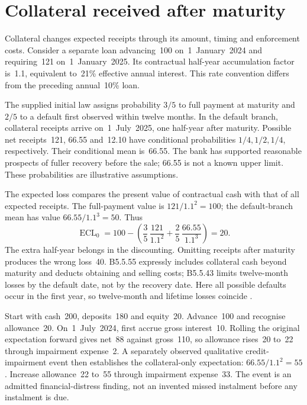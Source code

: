 \section{Collateral received after maturity}\label{sec:bank-late-collateral}

Collateral changes expected receipts through its amount, timing and
enforcement costs. Consider a separate loan advancing~100 on~1~January~2024
and requiring~121 on~1~January~2025. Its contractual half-year accumulation
factor is~1.1, equivalent to~21\% effective annual interest. This rate
convention differs from the preceding annual~10\% loan.

The supplied initial law assigns probability $3/5$ to full payment at maturity
and $2/5$ to a default first observed within twelve months. In the default
branch, collateral receipts arrive on~1~July~2025, one half-year after maturity.
Possible net receipts~121, 66.55 and~12.10 have conditional probabilities
$1/4,1/2,1/4$, respectively. Their conditional mean is~66.55. The bank has
supported reasonable prospects of fuller recovery before the sale; 66.55 is
not a known upper limit. These probabilities are illustrative assumptions.

The expected loss compares the present value of contractual cash with that
of all expected receipts. The full-payment value is $121/1.1^2=100$; the
default-branch mean has value $66.55/1.1^3=50$. Thus
\[
 \operatorname{ECL}_0
 =100-\left(\frac{3}{5}\,\frac{121}{1.1^2}
              +\frac{2}{5}\,\frac{66.55}{1.1^3}\right)=20.
\]
The extra half-year belongs in the discounting. Omitting receipts after
maturity produces the wrong loss~40. B5.5.55 expressly includes collateral
cash beyond maturity and deducts obtaining and selling costs; B5.5.43
limits twelve-month losses by the default date, not by the recovery date.
Here all possible defaults occur in the first year, so twelve-month and
lifetime losses coincide \citep[B5.5.43--44 and B5.5.55]{aasb9dated}.

Start with cash~200, deposits~180 and equity~20. Advance~100 and recognise
allowance~20. On~1~July~2024, first accrue gross interest~10. Rolling the
original expectation forward gives net~88 against gross~110, so allowance
rises~20 to~22 through impairment expense~2. A separately observed qualitative
credit-impairment event then establishes the collateral-only expectation:
$66.55/1.1^2=55$. Increase allowance~22 to~55 through impairment expense~33.
The event is an admitted financial-distress finding, not an invented missed
instalment before any instalment is due.

